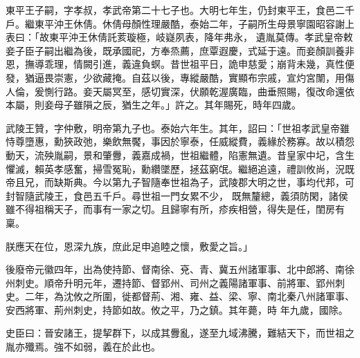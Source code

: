 \begin{pinyinscope}
 東平王子嗣，字孝叔，孝武帝第二十七子也。大明七年生，仍封東平王，食邑二千戶。繼東平沖王休倩。休倩母顏性理嚴酷，泰始二年，子嗣所生母景寧園昭容謝上表曰：「故東平沖王休倩託荄璇極，岐嶷夙表，降年弗永，
 遺胤莫傳。孝武皇帝敕妾子臣子嗣出繼為後，既承國祀，方奉烝薦，庶覃遐慶，式延于遠。而妾顏訓養非恩，撫導乖理，情闕引進，義違負螟。昔世祖平日，詭申慈愛；崩背未幾，真性便發，猶逼畏崇憲，少欲藏掩。自茲以後，專縱嚴酷，實顯布宗戚，宣灼宮闈，用傷人倫，爰惻行路。妾天屬冥至，感切實深，伏願乾渥廣臨，曲垂照賜，復改命還依本屬，則妾母子雖隕之辰，猶生之年。」許之。其年賜死，時年四歲。



 武陵王贊，字仲敷，明帝第九子也。泰始六年生。其年，詔曰：「世祖孝武皇帝雖恃尊墮惠，勳狹政弛，樂飲無饜，事因於寧泰，任威縱費，義緣於務寡。故以積怨動天，流殃胤嗣，景和肇釁，義嘉成禍，世祖繼體，陷憲無遺。昔皇家中圮，含生懼滅，賴英孝感奮，掃雪冤恥，勳纘墜歷，拯茲窮氓。繼絕追遠，禮訓攸尚，況既帝且兄，而缺斯典。今以第九子智隨奉世祖為子，武陵郡大明之世，事均代邦，可封智隨武陵王，食邑五千戶。尋世祖一門女累不少，
 既無釐總，義須防閑，諸侯雖不得祖稱天子，而事有一家之切。且歸寧有所，疹疾相營，得失是任，閨房有稟。



 朕應天在位，恩深九族，庶此足申追睦之懷，敷愛之旨。」



 後廢帝元徽四年，出為使持節、督南徐、兗、青、冀五州諸軍事、北中郎將、南徐州刺史。順帝升明元年，遷持節、督郢州、司州之義陽諸軍事、前將軍、郢州刺史。二年，為沈攸之所圍，徙都督荊、湘、雍、益、梁、寧、南北秦八州諸軍事、安西將軍、荊州刺史，持節如故。攸之平，乃之鎮。其年薨，時
 年九歲，國除。



 史臣曰：晉安諸王，提挈群下，以成其釁亂，遂至九域沸騰，難結天下，而世祖之胤亦殲焉。強不如弱，義在於此也。



\end{pinyinscope}